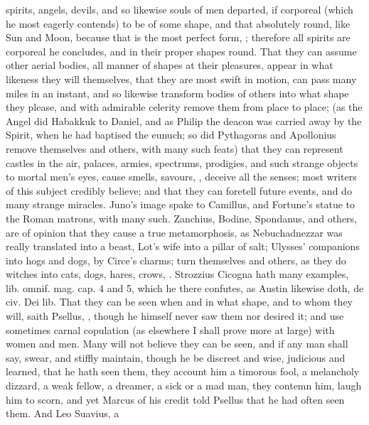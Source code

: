 {{spirits, angels, devils, and so likewise souls of men departed, if
corporeal (which he most eagerly contends) to be of some shape, and
that absolutely round, like Sun and Moon, because that is the most
perfect form, ; therefore all spirits are corporeal he
concludes, and in their proper shapes round. That they can assume other
aerial bodies, all manner of shapes at their pleasures, appear in what
likeness they will themselves, that they are most swift in motion, can
pass many miles in an instant, and so likewise transform bodies
of others into what shape they please, and with admirable celerity
remove them from place to place; (as the Angel did Habakkuk to Daniel,
and as Philip the deacon was carried away by the Spirit, when he had
baptised the eunuch; so did Pythagoras and Apollonius remove themselves
and others, with many such feats) that they can represent castles in
the air, palaces, armies, spectrums, prodigies, and such strange
objects to mortal men's eyes, cause smells, savours, \etc{}, deceive
all the senses; most writers of this subject credibly believe; and that
they can foretell future events, and do many strange miracles. Juno's
image spake to Camillus, and Fortune's statue to the Roman matrons,
with many such. Zanchius, Bodine, Spondanus, and others, are of opinion
that they cause a true metamorphosis, as Nebuchadnezzar was really
translated into a beast, Lot's wife into a pillar of salt; Ulysses'
companions into hogs and dogs, by Circe's charms; turn themselves and
others, as they do witches into cats, dogs, hares, crows, \etc{}. Strozzius
Cicogna hath many examples, lib.  omnif. mag. cap. 4 and 5, which
he there confutes, as Austin likewise doth, de civ. Dei lib. 
That they can be seen when and in what shape, and to whom they will,
saith Psellus, , though he
himself never saw them nor desired it; and use sometimes carnal
copulation (as elsewhere I shall prove more at large) with women
and men. Many will not believe they can be seen, and if any man shall
say, swear, and stiffly maintain, though he be discreet and wise,
judicious and learned, that he hath seen them, they account him a
timorous fool, a melancholy dizzard, a weak fellow, a dreamer, a sick
or a mad man, they contemn him, laugh him to scorn, and yet Marcus of
his credit told Psellus that he had often seen them. And Leo Suavius, a
}}
